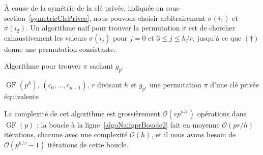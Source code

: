 \documentclass[a4paper, titlepage]{article}
\theoremstyle{definition}
\theoremstyle{remark}
\def\O{\mathcal O}
\def\gf{\operatorname{GF}}
\begin{document}
\`A cause de la symétrie de la clé privée, indiquée en sous-section~\ref{symetrieClePrivee}, nous pouvons choisir arbitrairement $\sigma(i_1)$ et $\sigma(i_2)$. Un algorithme naïf pour trouver la permutation $\sigma$ est de chercher exhaustivement les valeurs  $\sigma(i_j)$ pour $j=0$ et $3\leqslant j \leqslant h/r$, jusqu'à ce que $(\dagger)$ donne une permutation consistante.

\begin{algorithm}[h]
\caption{Algorithme pour trouver $\pi$ sachant $g_{p^r}$}
\label{algoNaifgpr}
\begin{algorithmic}[1]
\REQUIRE $\gf(p^h)$, $(c_0,\dots, c_{p-1})$, $r$ divisant $h$ et $g_{p^r}$
\ENSURE une permutation $\pi$ d'une clé privée équivalente
 \label{algoNaifgprBoucle}
	 \label{algoNaifgprBoucle2}
		\ELSE
		\ENDIF
	\ENDFOR
	\RETURN{$\pi$}
\ENDFOR
\end{algorithmic}
\end{algorithm}

La complexité de cet algorithme est grossièrement $\O(rp^{h/r})$ opérations dans $\gf(p)$ : la boucle à la ligne~\ref{algoNaifgprBoucle2} fait en moyenne $\O(pr/h)$ itérations, chacune avec une complexité $\O(h)$, et il nous avons besoin de $\O(p^{h/r}-1)$ itérations de cette boucle.
\end{document}

